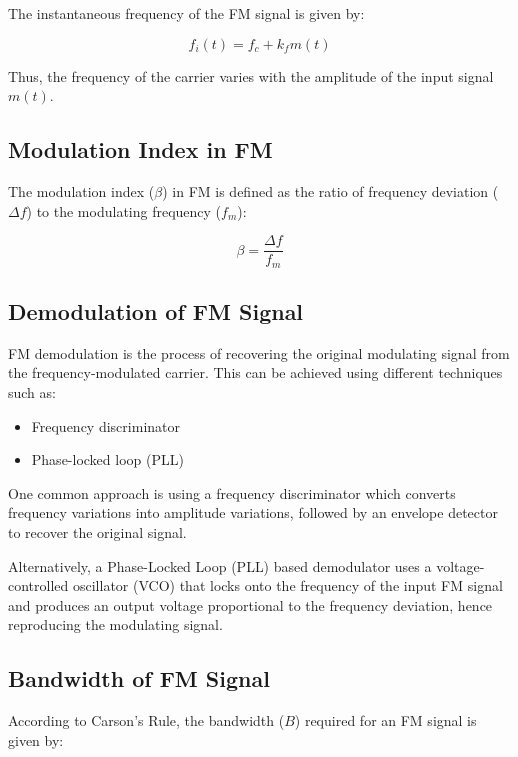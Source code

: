 \documentclass[a4paper,12pt]{article}
\begin{document}
	The instantaneous frequency of the FM signal is given by:
	
	\begin{equation}
		f_i(t) = f_c + k_f m(t)
	\end{equation}
	
	Thus, the frequency of the carrier varies with the amplitude of the input signal $m(t)$.
	
	\subsection{Modulation Index in FM}
	
	The modulation index ($\beta$) in FM is defined as the ratio of frequency deviation ($\Delta f$) to the modulating frequency ($f_m$):
	
	\begin{equation}
		\beta = \frac{\Delta f}{f_m}
	\end{equation}
	
	\subsection{Demodulation of FM Signal}
	
	FM demodulation is the process of recovering the original modulating signal from the frequency-modulated carrier. This can be achieved using different techniques such as:
	\begin{itemize}
		\item Frequency discriminator
		\item Phase-locked loop (PLL)
	\end{itemize}
	
	One common approach is using a frequency discriminator which converts frequency variations into amplitude variations, followed by an envelope detector to recover the original signal.
	
	Alternatively, a Phase-Locked Loop (PLL) based demodulator uses a voltage-controlled oscillator (VCO) that locks onto the frequency of the input FM signal and produces an output voltage proportional to the frequency deviation, hence reproducing the modulating signal.
	
	\subsection{Bandwidth of FM Signal}
	
	According to Carson’s Rule, the bandwidth ($B$) required for an FM signal is given by:
	
\end{document}
